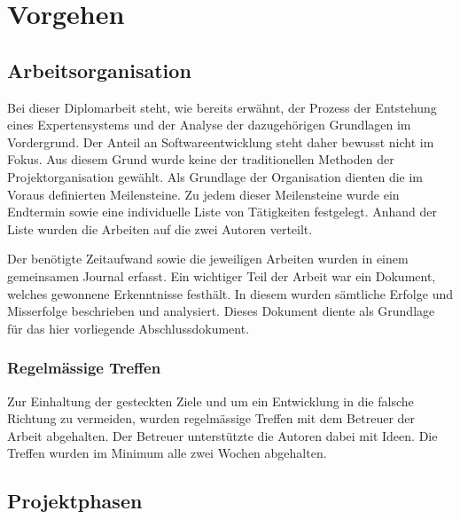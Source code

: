 \chapter{Vorgehen}
\label{chap:vorgehen}


\section{Arbeitsorganisation}
\label{sec:vorgehen_orga}

Bei dieser Diplomarbeit steht, wie bereits erwähnt, der Prozess der Entstehung eines Expertensystems und der Analyse der dazugehörigen Grundlagen im Vordergrund. Der Anteil an Softwareentwicklung steht daher bewusst nicht im Fokus. Aus diesem Grund wurde keine der traditionellen Methoden der Projektorganisation gewählt.
Als Grundlage der Organisation dienten die im Voraus definierten Meilensteine. Zu jedem dieser Meilensteine wurde ein Endtermin sowie eine individuelle Liste von Tätigkeiten festgelegt. Anhand der Liste wurden die Arbeiten auf die zwei Autoren verteilt.

Der benötigte Zeitaufwand sowie die jeweiligen Arbeiten wurden in einem gemeinsamen Journal erfasst. Ein wichtiger Teil der Arbeit war ein Dokument, welches gewonnene Erkenntnisse festhält. In diesem wurden sämtliche Erfolge und Misserfolge beschrieben und analysiert. Dieses Dokument diente als Grundlage für das hier vorliegende Abschlussdokument.

\subsection{Regelmässige Treffen}
\label{sec:vorgehen_orga_treffen}
Zur Einhaltung der gesteckten Ziele und um ein Entwicklung in die falsche Richtung zu vermeiden, wurden regelmässige Treffen mit dem Betreuer der Arbeit abgehalten. Der Betreuer unterstützte die Autoren dabei mit Ideen. Die Treffen wurden im Minimum alle zwei Wochen abgehalten.

\section{Projektphasen}
\label{sec:projektphasen}

